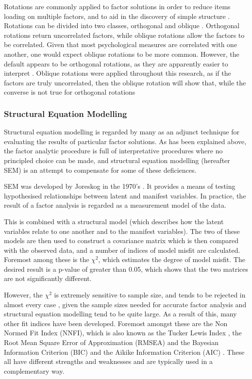 Rotations are commonly applied to factor solutions in order to reduce items loading on multiple factors, and to aid in the discovery of simple structure \cite{henson2006use}. Rotations can be divided into two classes, orthogonal and oblique \cite{sass2010comparative}. Orthogonal rotations return uncorrelated factors, while oblique rotations allow the factors to be correlated. Given that most psychological measures are correlated with one another, one would expect oblique rotations to be more common. However, the default appears to be orthogonal rotations, as they are apparently easier to interpret \cite{henson2006use}. Oblique rotations were applied throughout this research, as if the factors are truly uncorrelated, then the oblique rotation will show that, while the converse is not true for orthogonal rotations 



\subsubsection{Structural Equation Modelling}

Structural equation modelling is regarded by many as an adjunct technique for evaluating the results of particular factor solutions\cite{fabrigar1999evaluating}. As has been explained above, the factor analytic procedure is full of interpretative procedures where no principled choice can be made, and structural equation modelling (hereafter SEM) is an attempt to compensate for some of these deficiences.

SEM was developed by Joreskog in the 1970's \cite{joreskog1978structural}. It provides a means of testing hypothesised relationships between latent and manifest variables. In practice, the result of a factor analysis is regarded as a measurement model of the data.

This is combined with a structural model (which describes how the latent variables relate to one another and to the manifest variables). The two of these models are then used to construct a covariance matrix which is then compared with the observed data, and a number of indices of model misfit are calculated. Foremost among these is the $\chi^2$, which estimates the degree of model misfit. The desired result is a p-value of greater than 0.05, which shows that the two matrices are not significantly different.

However, the $\chi^2$  is extremely sensitive to sample size, and tends to be rejected in almost every case \cite{henson2006use}, given the sample sizes needed for accurate factor analysis and structural equation modelling tend to be quite large. As a result of this, many other fit indices have been developed. Foremost amongst these are the Non Normed Fit Index (NNFI), which is also known as the Tucker Lewis Index \cite{bentler1990comparative}, the Root Mean Square Error of Approximation (RMSEA) \cite{rigdon1996cfi} and the Bayesian Information Criterion (BIC) \cite{schwarz1978estimating} and the Aikike Information Criterion (AIC) \cite{akaike1974new}. These all have different strengths and weaknesses and are typically used in a complementary way.

